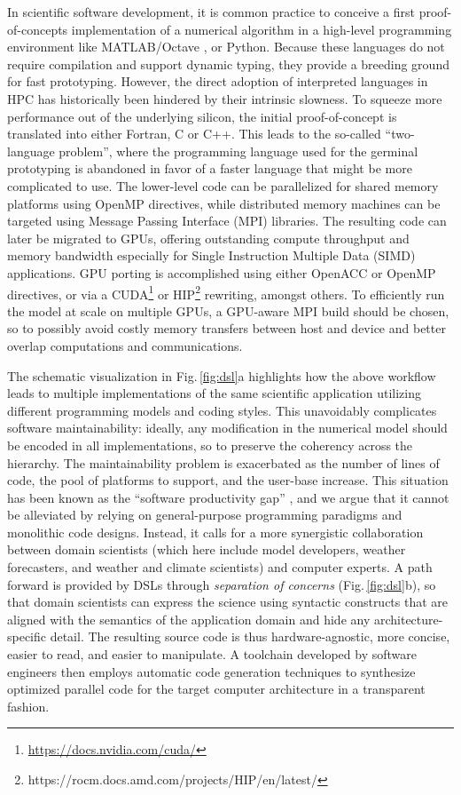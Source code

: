 \documentclass[gmd,manuscript,online]{copernicus}
\theoremstyle{theorem}
\theoremstyle{definition}
\theoremstyle{remark}
\theoremstyle{proposition}
\begin{document}
	In scientific software development, it is common practice to conceive a first proof-of-concepts implementation of a numerical algorithm in a high-level programming environment like MATLAB/Octave \citep{lindfield18}, or Python. Because these languages do not require compilation and support dynamic typing, they provide a breeding ground for fast prototyping. However, the direct adoption of interpreted languages in HPC has historically been hindered by their intrinsic slowness. To squeeze more performance out of the underlying silicon, the initial proof-of-concept is translated into either Fortran, C or C++. This leads to the so-called ``two-language problem'', where the programming language used for the germinal prototyping is abandoned in favor of a faster language that might be more complicated to use. The lower-level code can be parallelized for shared memory platforms using OpenMP directives, while distributed memory machines can be targeted using Message Passing Interface (MPI) libraries. %
	The resulting code can later be migrated to GPUs, offering outstanding compute throughput and memory bandwidth especially for Single Instruction Multiple Data (SIMD) applications. GPU porting is accomplished using either OpenACC or OpenMP directives, or via a CUDA\footnote{\url{https://docs.nvidia.com/cuda/}} or HIP\footnote{{https://rocm.docs.amd.com/projects/HIP/en/latest/}} rewriting, amongst others. To efficiently run the model at scale on multiple GPUs, a GPU-aware MPI build should be chosen, so to possibly avoid costly memory transfers between host and device and better overlap computations and communications.

	The schematic visualization in Fig.\,\ref{fig:dsl}a highlights how the above workflow leads to multiple implementations of the same scientific application utilizing different programming models and coding styles. This unavoidably complicates software maintainability: ideally, any modification in the numerical model should be encoded in all implementations, so to preserve the coherency across the hierarchy. The maintainability problem is exacerbated as the number of lines of code, the pool of platforms to support, and the user-base increase. This situation has been known as the ``software productivity gap'' \citep{lawrence18}, and we argue that it cannot be alleviated by relying on general-purpose programming paradigms and monolithic code designs. Instead, it calls for a more synergistic collaboration between domain scientists (which here include model developers, weather forecasters, and weather and climate scientists) and computer experts. A path forward is provided by DSLs through \emph{separation of concerns} (Fig.\,\ref{fig:dsl}b), so that domain scientists can express the science using syntactic constructs that are aligned with the semantics of the application domain and hide any architecture-specific detail. The resulting source code is thus hardware-agnostic, more concise, easier to read, and easier to manipulate. A toolchain developed by software engineers then employs automatic code generation techniques to synthesize optimized parallel code for the target computer architecture in a transparent fashion.
\end{document}
